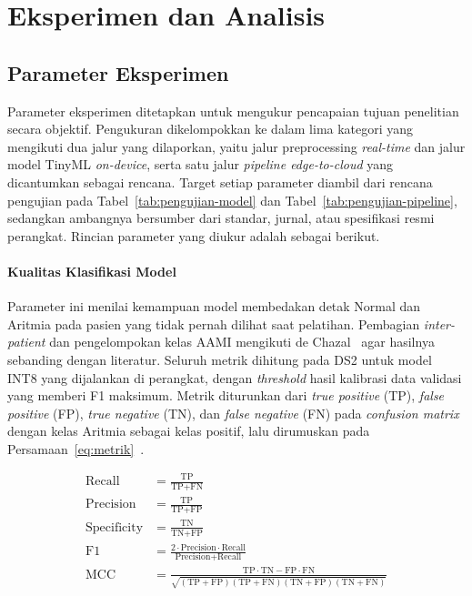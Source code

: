 \chapter{Eksperimen dan Analisis}

\section{Parameter Eksperimen}

Parameter eksperimen ditetapkan untuk mengukur pencapaian tujuan penelitian secara objektif. Pengukuran dikelompokkan ke dalam lima kategori yang mengikuti dua jalur yang dilaporkan, yaitu jalur preprocessing \textit{real-time} dan jalur model TinyML \textit{on-device}, serta satu jalur \textit{pipeline edge-to-cloud} yang dicantumkan sebagai rencana. Target setiap parameter diambil dari rencana pengujian pada Tabel~\ref{tab:pengujian-model} dan Tabel~\ref{tab:pengujian-pipeline}, sedangkan ambangnya bersumber dari standar, jurnal, atau spesifikasi resmi perangkat. Rincian parameter yang diukur adalah sebagai berikut.

\subsubsection{Kualitas Klasifikasi Model}

Parameter ini menilai kemampuan model membedakan detak Normal dan Aritmia pada pasien yang tidak pernah dilihat saat pelatihan. Pembagian \textit{inter-patient} dan pengelompokan kelas AAMI mengikuti de Chazal~\cite{aami_ec57_2012, dechazal_2004} agar hasilnya sebanding dengan literatur. Seluruh metrik dihitung pada DS2 untuk model INT8 yang dijalankan di perangkat, dengan \textit{threshold} hasil kalibrasi data validasi yang memberi F1 maksimum. Metrik diturunkan dari \textit{true positive} (TP), \textit{false positive} (FP), \textit{true negative} (TN), dan \textit{false negative} (FN) pada \textit{confusion matrix} dengan kelas Aritmia sebagai kelas positif, lalu dirumuskan pada Persamaan~\ref{eq:metrik}~\cite{chicco_2020}.

\begin{align}
\text{Recall} &= \frac{\text{TP}}{\text{TP} + \text{FN}} \nonumber \\
\text{Precision} &= \frac{\text{TP}}{\text{TP} + \text{FP}} \nonumber \\
\text{Specificity} &= \frac{\text{TN}}{\text{TN} + \text{FP}} \nonumber \\
\text{F1} &= \frac{2 \cdot \text{Precision} \cdot \text{Recall}}{\text{Precision} + \text{Recall}} \nonumber \\
\text{MCC} &= \frac{\text{TP} \cdot \text{TN} - \text{FP} \cdot \text{FN}}{\sqrt{(\text{TP} + \text{FP})(\text{TP} + \text{FN})(\text{TN} + \text{FP})(\text{TN} + \text{FN})}}
\label{eq:metrik}
\end{align}

